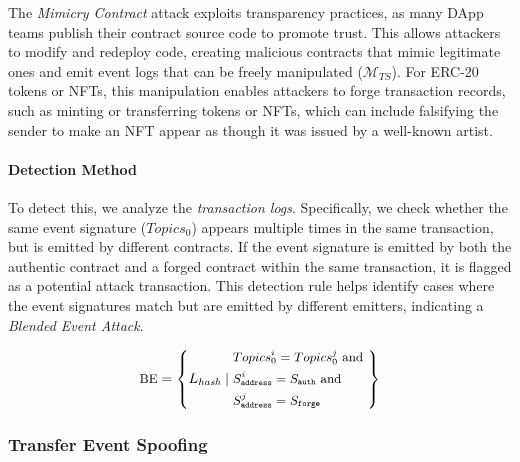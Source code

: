 The \emph{Mimicry Contract} attack exploits transparency practices, as many DApp teams publish their contract source code to promote trust. This allows attackers to modify and redeploy code, creating malicious contracts that mimic legitimate ones and emit event logs that can be freely manipulated (\(\bm{\mathcal{M}}_{TS}\)). For ERC-20 tokens or NFTs, this manipulation enables attackers to forge transaction records, such as minting or transferring tokens or NFTs, which can include falsifying the sender to make an NFT appear as though it was issued by a well-known artist.

\paragraph{Detection Method}
To detect this, we analyze the \emph{transaction logs}. Specifically, we check whether the same event signature (\( Topics_0 \)) appears multiple times in the same transaction, but is emitted by different contracts. If the event signature is emitted by both the authentic contract and a forged contract within the same transaction, it is flagged as a potential attack transaction. This detection rule helps identify cases where the event signatures match but are emitted by different emitters, indicating a \emph{Blended Event Attack}.


\begin{equation}
\small
\text{BE} = \left\{
L_{\textit{hash}} \mid
\begin{aligned}
  & Topics_0^i = Topics_0^j \text{ and } \\
  & S_{\texttt{address}}^i = S_{\texttt{auth}} \text{ and } \\
  & S_{\texttt{address}}^j = S_{\texttt{forge}}
\end{aligned}
\right\}
\end{equation}



\subsubsection{Transfer Event Spoofing}\label{vec:attack4}

